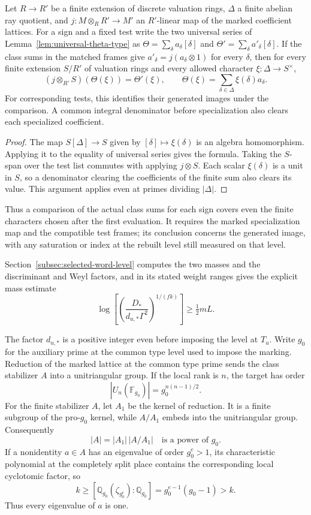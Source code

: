 \begin{auxlemma}\label{lem:marked-ray-specialization}
Let \(R\to R'\) be a finite extension of discrete valuation rings,
\(\Delta\) a finite abelian ray quotient, and \(j:M\otimes_R R'\to M'\)
an \(R'\)-linear map of the marked coefficient lattices. For a sign and a
fixed test write the two universal series of
Lemma~\ref{lem:universal-theta-type} as \(\Theta=\sum_\delta a_\delta[\delta]\)
and \(\Theta'=\sum_\delta a'_\delta[\delta]\). If the class sums in the
matched frames give \(a'_\delta=j(a_\delta\otimes1)\) for every
\(\delta\), then for every finite extension \(S/R'\) of valuation rings
and every allowed character \(\xi:\Delta\to S^\times\),
\[
 (j\otimes_{R'}S)(\Theta(\xi))=\Theta'(\xi),\qquad
              \Theta(\xi)=\sum_{\delta\in\Delta}\xi(\delta)a_\delta .
\]
For corresponding tests, this identifies their generated images
under the comparison. A common integral denominator before
specialization also clears each specialized coefficient.
\end{auxlemma}
\begin{proof}
The map \(S[\Delta]\to S\) given by \([\delta]\mapsto\xi(\delta)\)
is an algebra homomorphism. Applying it to the equality of universal
series gives the formula. Taking the \(S\)-span over the test list
commutes with applying \(j\otimes S\). Each scalar \(\xi(\delta)\)
is a unit in \(S\), so a denominator clearing the coefficients of
the finite sum also clears its value. This argument applies even at
primes dividing \(|\Delta|\).
\end{proof}

Thus a comparison of the actual class sums for each sign covers even
the finite characters chosen after the first evaluation. It requires
the marked specialization map and the compatible test frames; its
conclusion concerns the generated image, with any saturation or index
at the rebuilt level still measured on that level.

Section~\ref{subsec:selected-word-level} computes the two
masses and the discriminant and Weyl factors, and in its stated weight ranges gives the explicit mass estimate 
\[
 \log\!\left[\left(\frac{D_*}{d_{u,*}\Gamma^2}\right)^{1/(fk)}\right]\ge \tfrac12 mL.
\]

The factor \(d_{u,*}\) is a positive integer even before imposing
the level at \(T_u\). Write \(g_0\) for the auxiliary prime
at the common type level used to impose the marking. Reduction of the marked lattice at the common type prime sends the class stabilizer \(A\) into a unitriangular group. If the local rank is \(n\), the target has order
\[
 |U_n(\mathbb F_{g_0})|=g_0^{n(n-1)/2}.
\] For the finite stabilizer \(A\), let \(A_1\) be the kernel of reduction. It is a finite subgroup of the pro-\(g_0\) kernel, while \(A/A_1\) embeds into the unitriangular group. Consequently
\[
 |A|=|A_1|\,|A/A_1|\quad\text{is a power of }g_0 .
\]
If a nonidentity \(a\in A\) has an eigenvalue of order \(g_0^e>1\),
its characteristic polynomial at the completely split place contains
the corresponding local cyclotomic factor, so
\[
           k\ge [\mathbb Q_{g_0}(\zeta_{g_0^e}):\mathbb Q_{g_0}]
                     =g_0^{e-1}(g_0-1)>k .
\]
Thus every eigenvalue of \(a\) is one.

